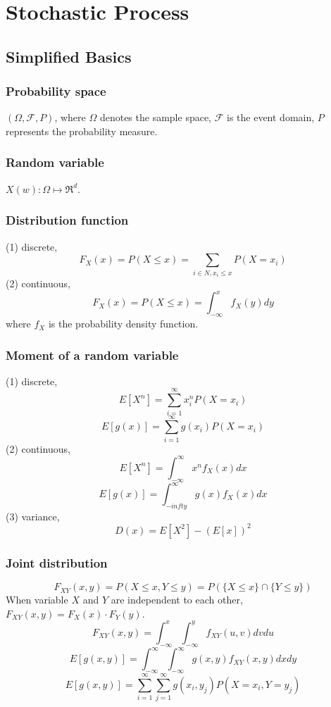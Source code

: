 \chapter{Stochastic Process}

\section{Simplified Basics}

\subsection{Probability space}

$(\Omega,\mathcal{F},P)$, where $\Omega$ denotes the sample
space, $\mathcal{F}$ is the event domain, $P$ represents the probability
measure.

\subsection{Random variable}

$X(w): \Omega\mapsto\Re^d$.

\subsection{Distribution function}

(1) discrete,
$$F_X(x) = P(X\leq x) = \sum_{i\in N, x_i \leq x} P(X=x_i)$$
(2) continuous,
$$F_X(x) = P(X\leq x) = \int_{-\infty}^x f_X(y)dy$$
where $f_X$ is the probability density function.

\subsection{Moment of a random variable}

(1) discrete,
$$E[X^n] = \sum_{i=1}^\infty x_i^n P(X=x_i)$$
$$E[g(x)] = \sum_{i=1}^\infty g(x_i)P(X=x_i)$$
(2) continuous,
$$E[X^n] = \int_{-\infty}^\infty x^n f_X(x)dx$$
$$E[g(x)] = \int_{-infty}^\infty g(x)f_X(x)dx$$
(3) variance,
$$D(x) = E[X^2] - (E[x])^2$$

\subsection{Joint distribution}

$$F_{XY}(x,y) = P(X\leq x, Y\leq y) = P(\{X\leq x\}\cap \{Y\leq y\})$$
When variable $X$ and $Y$ are independent to each other, $F_{XY}(x,y)=F_X(x)\cdot F_Y(y)$.
$$F_{XY}(x,y) = \int_{-\infty}^x \int_{-\infty}^y f_{XY}(u, v)dvdu$$
$$E[g(x,y)] = \int_{-\infty}^\infty \int_{-\infty}^\infty g(x,y) f_{XY}(x, y)dxdy$$
$$E[g(x,y)] = \sum_{i=1}^\infty \sum_{j=1}^\infty g(x_i, y_j) P(X=x_i, Y=y_j)$$

